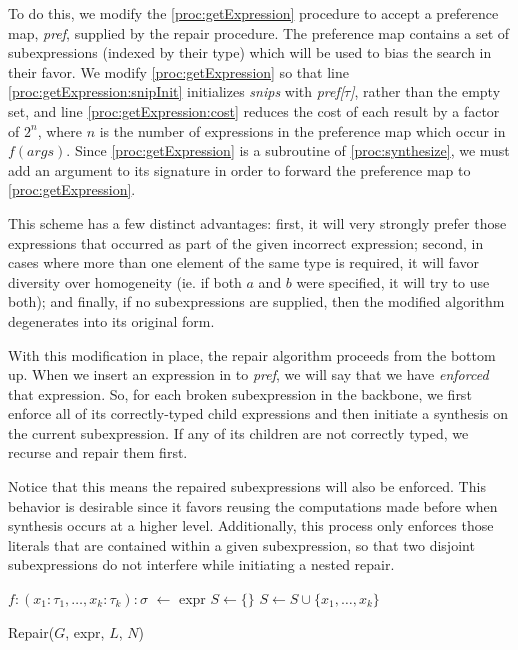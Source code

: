 To do this, we modify the \ref{proc:getExpression} procedure to accept a preference map, \textit{pref}, supplied by the repair procedure. The preference map contains a set of subexpressions (indexed by their type) which will be used to bias the search in their favor. We modify \ref{proc:getExpression} so that line \ref{proc:getExpression:snipInit} initializes \textit{snips} with \textit{pref[$\tau$]}, rather than the empty set, and line \ref{proc:getExpression:cost} reduces the cost of each result by a factor of $2^{n}$, where $n$ is the number of expressions in the preference map which occur in $f(args)$. Since \ref{proc:getExpression} is a subroutine of \ref{proc:synthesize}, we must add an argument to its signature in order to forward the preference map to \ref{proc:getExpression}.

This scheme has a few distinct advantages: first, it will very strongly prefer those expressions that occurred as part of the given incorrect expression; second, in cases where more than one element of the same type is required, it will favor diversity over homogeneity (ie. if both $a$ and $b$ were specified, it will try to use both); and finally, if no subexpressions are supplied, then the modified algorithm degenerates into its original form.

With this modification in place, the repair algorithm proceeds from the bottom up. When we insert an expression  in to \textit{pref}, we will say that we have \textit{enforced} that expression. So, for each broken subexpression in the backbone, we first enforce all of its correctly-typed child expressions and then initiate a synthesis on the current subexpression. If any of its children are not correctly typed, we recurse and repair them first.

Notice that this means the repaired subexpressions will also be enforced. This behavior is desirable since it favors reusing the computations made before when synthesis occurs at a higher level. Additionally, this process  only enforces those literals that are contained within a given subexpression, so that two disjoint subexpressions do not interfere while initiating a nested repair.

\begin{procedure}
$f: (x_1: \tau_1, \ldots, x_k: \tau_k): \sigma$ $\leftarrow$ expr\;
$S \leftarrow \{\}$ \;
$S \leftarrow S \cup \{x_1,\ldots,x_k\}$ \;
\caption{Repair($G$, expr, $L$, $N$)}\label{proc:repair}
\end{procedure}

\lipsum[1-19]
